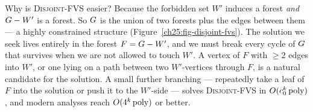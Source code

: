 \begin{whybox}
Why is \textsc{Disjoint-FVS} easier? Because the forbidden set $W'$ induces a forest \emph{and} $G - W'$ is a forest. So $G$ is the union of two forests plus the edges between them --- a highly constrained structure (Figure~\ref{ch25:fig-disjoint-fvs}). The solution we seek lives entirely in the forest $F=G-W'$, and we must break every cycle of $G$ that survives when we are not allowed to touch $W'$. A vertex of $F$ with $\ge 2$ edges into $W'$, or one lying on a path between two $W'$-vertices through $F$, is a natural candidate for the solution. A small further branching --- repeatedly take a leaf of $F$ into the solution or push it to the $W'$-side --- solves \textsc{Disjoint-FVS} in $O(c_0^{k}\operatorname{poly})$, and modern analyses reach $O(4^{k}\operatorname{poly})$ or better.
\end{whybox}

